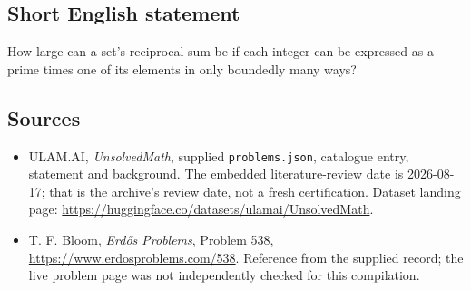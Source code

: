 \documentclass[11pt,a4paper]{article}
\begin{document}
\subsection{Short English statement}

How large can a set's reciprocal sum be if each integer can be expressed as a prime times one of its elements in only boundedly many ways?

\subsection{Sources}

{\small

\begin{itemize}

\item[\hypertarget{source:statement:1}{S1}] ULAM.AI, \emph{UnsolvedMath}, supplied \texttt{problems.json}, catalogue entry, statement and background. The embedded literature-review date is 2026-08-17; that is the archive’s review date, not a fresh certification. Dataset landing page: \url{https://huggingface.co/datasets/ulamai/UnsolvedMath}.

\item[\hypertarget{source:statement:2}{S2}] T. F. Bloom, \emph{Erdős Problems}, Problem 538, \url{https://www.erdosproblems.com/538}. Reference from the supplied record; the live problem page was not independently checked for this compilation.

\end{itemize}

}

\label{end:statement}
\end{document}
